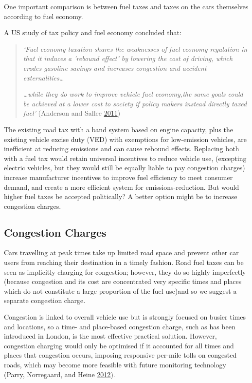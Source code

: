 \documentclass[]{tufte-handout}
\begin{document}
One important comparison is between fuel taxes and taxes on the cars
themselves according to fuel economy.

A US study of tax policy and fuel economy concluded that:

\begin{quote}
\emph{`Fuel economy taxation shares the weaknesses of fuel economy
regulation in that it induces a 'rebound effect' by lowering the cost of
driving, which erodes gasoline savings and increases congestion and
accident externalities\ldots{}}

\emph{\ldots{}while they do work to improve vehicle fuel economy,the
same goals could be achieved at a lower cost to society if policy makers
instead directly taxed fuel'} (Anderson and Sallee
\protect\hyperlink{ref-Anderson2011}{2011})
\end{quote}

The existing road tax with a band system based on engine capacity, plus
the existing vehicle excise duty (VED) with exemptions for low-emission
vehicles, are inefficient at reducing emissions and can cause rebound
effects. Replacing both with a fuel tax would retain universal
incentives to reduce vehicle use, (excepting electric vehicles, but they
would still be equally liable to pay congestion charges) increase
manufacturer incentives to improve fuel efficiency to meet consumer
demand, and create a more efficient system for emissions-reduction. But
would higher fuel taxes be accepted politically? A better option might
be to increase congestion charges.

\hypertarget{congestion-charges}{%
\subsection{Congestion Charges}\label{congestion-charges}}

Cars travelling at peak times take up limited road space and prevent
other car users from reaching their destination in a timely fashion.
Road fuel taxes can be seen as implicitly charging for congestion;
however, they do so highly imperfectly (because congestion and its cost
are concentrated very specific times and places which do not constitute
a large proportion of the fuel use)and so we suggest a separate
congestion charge.

Congestion is linked to overall vehicle use but is strongly focused on
busier times and locations, so a time- and place-based congestion
charge, such as has been introduced in London, is the most effective
practical solution. However, congestion charging would only be optimised
if it accounted for all times and places that congestion occurs,
imposing responsive per-mile tolls on congested roads, which may become
more feasible with future monitoring technology (Parry, Norregaard, and
Heine \protect\hyperlink{ref-Parry2012}{2012}).
\end{document}
